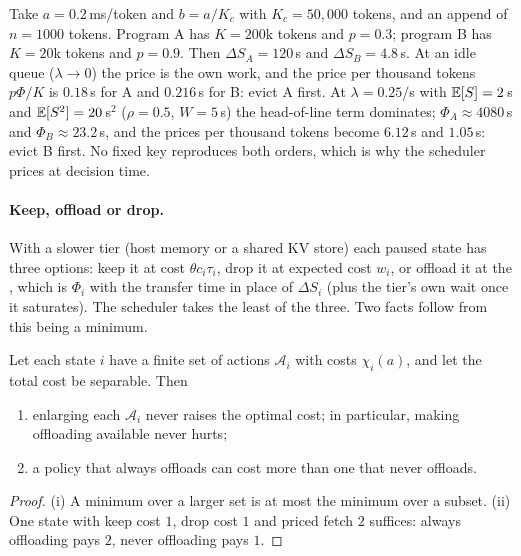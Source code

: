 \begin{example}\label{L5:ex:flip}
Take $a=0.2$\,ms/token and $b=a/K_c$ with $K_c=50{,}000$ tokens, and an
append of $n=1000$ tokens. Program A has $K=200$k tokens and $p=0.3$;
program B has $K=20$k tokens and $p=0.9$. Then $\Delta S_A=120$\,s and
$\Delta S_B=4.8$\,s. At an idle queue ($\lambda\to0$) the price is the own
work, and the price per thousand tokens $p\Phi/K$ is $0.18$\,s for A and
$0.216$\,s for B: evict A first. At $\lambda=0.25$/s with $\mathbb{E}[S]=2$\,s and
$\mathbb{E}[S^2]=20$\,s$^2$ ($\rho=0.5$, $W=5$\,s) the head-of-line term dominates;
$\Phi_A\approx4080$\,s and $\Phi_B\approx23.2$\,s, and the prices per
thousand tokens become $6.12$\,s and $1.05$\,s: evict B first. No fixed key
reproduces both orders, which is why the scheduler prices at decision time.
\end{example}

\paragraph{Keep, offload or drop.} With a slower tier (host memory or a
shared KV store) each paused state has three options: keep it at cost
$\theta c_i\tau_i$, drop it at expected cost $w_i$, or offload it at the
, which is $\Phi_i$ with the transfer time in place of
$\Delta S_i$ (plus the tier's own wait once it saturates). The scheduler
takes the least of the three. Two facts follow from this being a minimum.

\begin{proposition}\label{L5:prop:offload}
Let each state $i$ have a finite set of actions $\mathcal{A}_i$ with
costs $\chi_i(a)$, and let the total cost be separable. Then
\begin{enumerate}[label=(\roman*)]
\item enlarging each $\mathcal{A}_i$ never raises the optimal cost; in
  particular, making offloading available never hurts;
\item a policy that always offloads can cost more than one that never
  offloads.
\end{enumerate}
\end{proposition}

\begin{proof}
(i) A minimum over a larger set is at most the minimum over a subset.
(ii) One state with keep cost $1$, drop cost $1$ and priced fetch $2$
suffices: always offloading pays $2$, never offloading pays $1$.
\end{proof}

